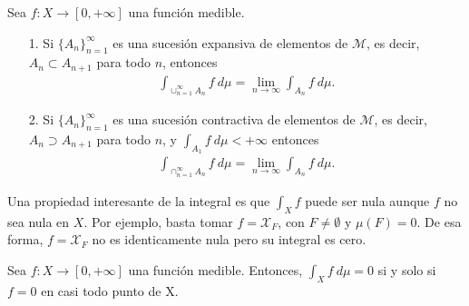  \begin{obs}
 Sea $f: X \longrightarrow [0,+\infty]$ una función medible.
 \begin{enumerate}
     \item[1.] Si $\{A_n\}_{n=1}^{\infty}$ es una sucesión expansiva de elementos de $\mathcal{M}$, es decir, $A_n \subset A_{n+1}$ para todo $n$, entonces
     \begin{align*}
         \int_{\cup_{n=1}^{\infty}{A_n}}{f \ d\mu} = \lim_{n \to \infty}{\int_{A_n}{f \ d\mu}}.
     \end{align*}
     \item[2.] Si $\{A_n\}_{n=1}^{\infty}$ es una sucesión contractiva de elementos de $\mathcal{M}$, es decir, $A_n \supset A_{n+1}$ para todo $n$, y $\int_{A_1}{f \ d\mu} < +\infty$ entonces
     \begin{align*}
         \int_{\cap_{n=1}^{\infty}{A_n}}{f \ d\mu} = \lim_{n \to \infty}{\int_{A_n}{f \ d\mu}}.
     \end{align*}
 \end{enumerate}
 \end{obs}
Una propiedad interesante de la integral es que $\int_{X}{f}$ puede ser nula aunque $f$ no sea nula en $X$. Por ejemplo, basta tomar $f = \mathcal{X}_F$, con $F \not = \emptyset$ y $\mu(F) = 0$. De esa forma, $f = \mathcal{X}_F$ no es identicamente nula pero su integral es cero.
\begin{prop}
Sea $f: X \longrightarrow [0,+\infty]$ una función medible. Entonces, $\int_{X}{f \ d\mu} = 0$ si y solo si $f = 0$ en casi todo punto de X.
\end{prop}


